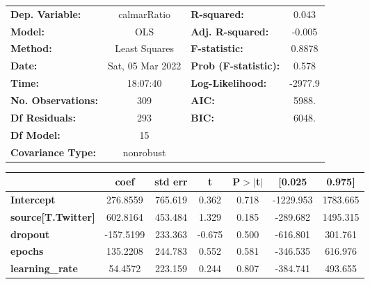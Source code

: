 \begin{center}
\begin{tabular}{lclc}
\toprule
\textbf{Dep. Variable:}              &   calmarRatio    & \textbf{  R-squared:         } &     0.043   \\
\textbf{Model:}                      &       OLS        & \textbf{  Adj. R-squared:    } &    -0.005   \\
\textbf{Method:}                     &  Least Squares   & \textbf{  F-statistic:       } &    0.8878   \\
\textbf{Date:}                       & Sat, 05 Mar 2022 & \textbf{  Prob (F-statistic):} &    0.578    \\
\textbf{Time:}                       &     18:07:40     & \textbf{  Log-Likelihood:    } &   -2977.9   \\
\textbf{No. Observations:}           &         309      & \textbf{  AIC:               } &     5988.   \\
\textbf{Df Residuals:}               &         293      & \textbf{  BIC:               } &     6048.   \\
\textbf{Df Model:}                   &          15      & \textbf{                     } &             \\
\textbf{Covariance Type:}            &    nonrobust     & \textbf{                     } &             \\
\bottomrule
\end{tabular}
\begin{tabular}{lcccccc}
                                     & \textbf{coef} & \textbf{std err} & \textbf{t} & \textbf{P$> |$t$|$} & \textbf{[0.025} & \textbf{0.975]}  \\
\midrule
\textbf{Intercept}                   &     276.8559  &      765.619     &     0.362  &         0.718        &    -1229.953    &     1783.665     \\
\textbf{source[T.Twitter]}           &     602.8164  &      453.484     &     1.329  &         0.185        &     -289.682    &     1495.315     \\
\textbf{dropout}                     &    -157.5199  &      233.363     &    -0.675  &         0.500        &     -616.801    &      301.761     \\
\textbf{epochs}                      &     135.2208  &      244.783     &     0.552  &         0.581        &     -346.535    &      616.976     \\
\textbf{learning\_rate}              &      54.4572  &      223.159     &     0.244  &         0.807        &     -384.741    &      493.655     \\

\end{tabular}
\end{center}
